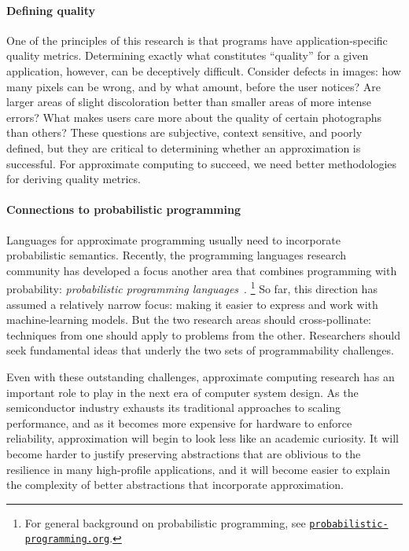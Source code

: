 \paragraph{Defining quality}
One of the principles of this research is that programs have
application-specific quality metrics.
Determining exactly what constitutes ``quality'' for a given application,
however, can be deceptively difficult.
Consider defects in images:
how many pixels can be wrong, and by what amount, before the user notices?
Are larger areas of slight discoloration better than smaller areas of more
intense errors?
What makes users care more about the quality of certain photographs than
others?
These questions are subjective, context sensitive, and poorly defined, but
they are critical to determining whether an approximation is successful.
For approximate computing to succeed, we need better methodologies for
deriving quality metrics.

\paragraph{Connections to probabilistic programming}
Languages for app\-roximate program\-ming usually need to incorporate probabilistic
semantics.
Recently, the programming languages research community has developed a focus
another area that combines programming with probability:
\emph{probabilistic programming languages}~\cite{BBGR13, wingate-lightweight,
  church, chaganty, pfeffersample, probdsl, koller}.%
\footnote{%
    For general background on probabilistic programming, see
    \href{http://probabilistic-programming.org/}{\texttt{probabilistic-programming.org}}.%
}
So far, this direction has assumed a relatively narrow focus:
making it easier to express and work with machine-learning models.
But the two research areas should cross-pollinate:
techniques from one should apply to problems from the other.
Researchers should seek fundamental ideas that underly the two sets of
programmability challenges.

\vspace{\baselineskip}
\noindent
Even with these outstanding challenges, approximate computing research
has an important role to play in the next era of computer system design.
As the semiconductor industry exhausts its traditional approaches to scaling
performance, and as it becomes more expensive for hardware to enforce
reliability,
approximation will begin to look less like an academic curiosity.
It will become harder to justify preserving abstractions that are oblivious to
the resilience in many high-profile applications,
and it will become easier to explain the complexity of better
abstractions that incorporate approximation.
